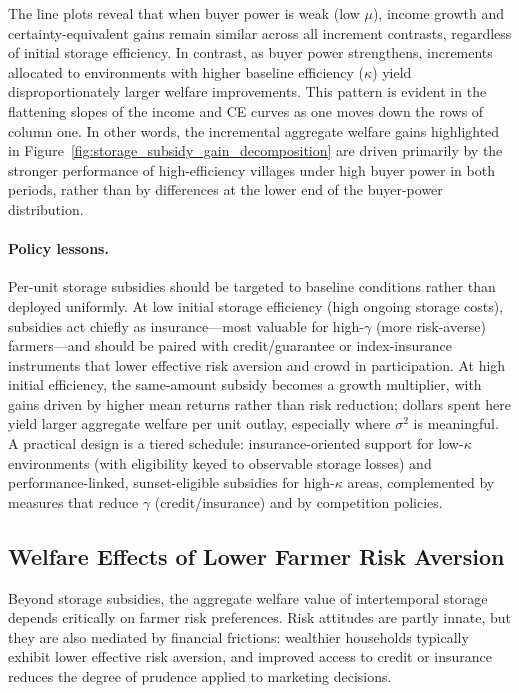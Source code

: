 The line plots reveal that when buyer power is weak (low $\mu$), income growth and certainty-equivalent gains remain similar across all increment contrasts, regardless of initial storage efficiency. In contrast, as buyer power strengthens, increments allocated to environments with higher baseline efficiency ($\kappa$) yield disproportionately larger welfare improvements. This pattern is evident in the flattening slopes of the income and CE curves as one moves down the rows of column one. In other words, the incremental aggregate welfare gains highlighted in Figure~\ref{fig:storage_subsidy_gain_decomposition} are driven primarily by the stronger performance of high-efficiency villages under high buyer power in both periods, rather than by differences at the lower end of the buyer-power distribution.


\paragraph{Policy lessons.}
Per-unit storage subsidies should be targeted to baseline conditions rather than deployed uniformly. At low initial storage efficiency (high ongoing storage costs), subsidies act chiefly as insurance---most valuable for high-$\gamma$ (more risk-averse) farmers---and should be paired with credit/guarantee or index-insurance instruments that lower effective risk aversion and crowd in participation. At high initial efficiency, the same-amount subsidy becomes a growth multiplier, with gains driven by higher mean returns rather than risk reduction; dollars spent here yield larger aggregate welfare per unit outlay, especially where $\sigma^2$ is meaningful. A practical design is a tiered schedule: insurance-oriented support for low-$\kappa$ environments (with eligibility keyed to observable storage losses) and performance-linked, sunset-eligible subsidies for high-$\kappa$ areas, complemented by measures that reduce $\gamma$ (credit/insurance) and by competition policies.


\subsection{Welfare Effects of Lower Farmer Risk Aversion}
\noindent Beyond storage subsidies, the aggregate welfare value of intertemporal storage depends critically on farmer risk preferences. Risk attitudes are partly innate, but they are also mediated by financial frictions: wealthier households typically exhibit lower effective risk aversion, and improved access to credit or insurance reduces the degree of prudence applied to marketing decisions.

